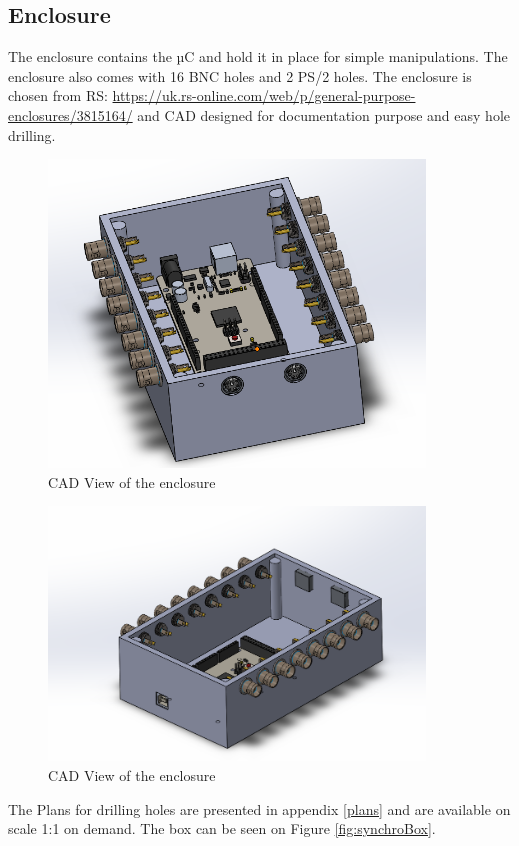 \documentclass[a4paper]{article}
\begin{document}
\subsection{Enclosure}
The enclosure contains the µC and hold it in place for simple manipulations. The enclosure also comes with 16 BNC holes and 2 PS/2 holes.
The enclosure is chosen from RS: \url{https://uk.rs-online.com/web/p/general-purpose-enclosures/3815164/} and CAD designed for documentation purpose and easy hole drilling.

\begin{figure}[h!t!b!]
    \centering
        \includegraphics[width = 10cm]{images/enclosure.PNG}
    \caption{CAD View of the enclosure}
    \label{fig:enclosure1}
\end{figure}

\begin{figure}[h!t!b!]
    \centering
        \includegraphics[width = 10cm]{images/enclosure2.PNG}
    \caption{CAD View of the enclosure}
    \label{fig:enclosure2}
\end{figure}

The Plans for drilling holes are presented in appendix \ref{plans} and are available on scale 1:1 on demand.
The box can be seen on Figure \ref{fig:synchroBox}.
\end{document}

